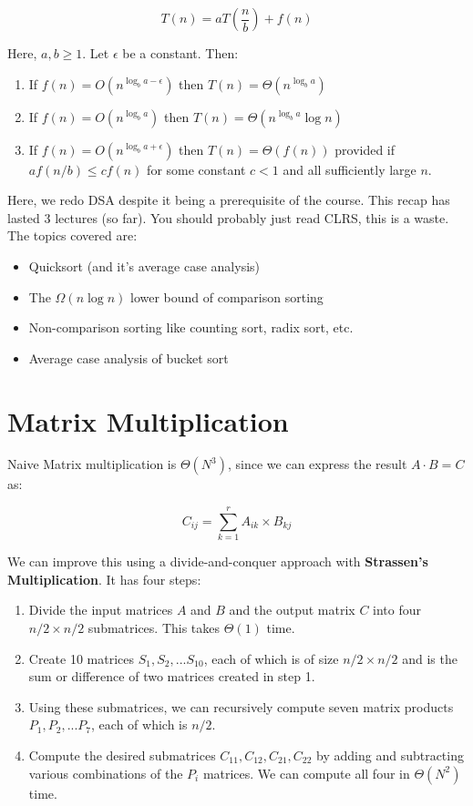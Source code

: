 \documentclass[12pt,letterpaper]{article}
\theoremstyle{definition}
\begin{document}
\[T(n) = aT\left(\frac{n}{b}\right) + f(n)\]

Here, $a, b \geq 1$. Let $\epsilon$ be a constant. Then:

\begin{enumerate}
  \item If $f(n) = O(n^{\log_ba - \epsilon})$ then $T(n) = \Theta(n^{\log_ba})$
  \item If $f(n) = O(n^{\log_ba})$ then $T(n) = \Theta(n^{\log_ba}\log{n})$
  \item If $f(n) = O(n^{\log_ba + \epsilon})$ then $T(n) = \Theta(f(n))$ provided if $af(n/b) \leq cf(n)$ for some constant $c <1$ and all sufficiently large $n$.
\end{enumerate}

Here, we redo DSA despite it being a prerequisite of the course. This recap has lasted 3 lectures (so far). You should probably just read CLRS, this is a waste. The topics covered are:

\begin{itemize}
  \item Quicksort (and it's average case analysis)
  \item The $\Omega(n\log{n})$ lower bound of comparison sorting
  \item Non-comparison sorting like counting sort, radix sort, etc.
  \item Average case analysis of bucket sort
\end{itemize}

\section{Matrix Multiplication}

Naive Matrix multiplication is $\Theta(N^3)$, since we can express the result $A \cdot B  = C$ as:

\[C_{ij} = \sum_{k=1}^{r}A_{ik} \times B_{kj}\]

We can improve this using a divide-and-conquer approach with \textbf{Strassen's Multiplication}. It has four steps:

\begin{enumerate}
  \item Divide the input matrices $A$ and $B$ and the output matrix $C$ into four $n/2 \times n/2$ submatrices. This takes $\Theta(1)$ time.
  \item Create 10 matrices $S_1,S_2,...S_10$, each of which is of size $n/2 \times n/2$ and is the sum or difference of two matrices created in step 1.
  \item Using these submatrices, we can recursively compute seven matrix products $P_1,P_2,...P_7$, each of which is $n/2$.
  \item Compute the desired submatrices $C_{11},C_{12},C_{21},C_{22}$ by adding and subtracting various combinations of the $P_i$ matrices. We can compute all four in $\Theta(N^2)$ time.
\end{enumerate}
\end{document}
